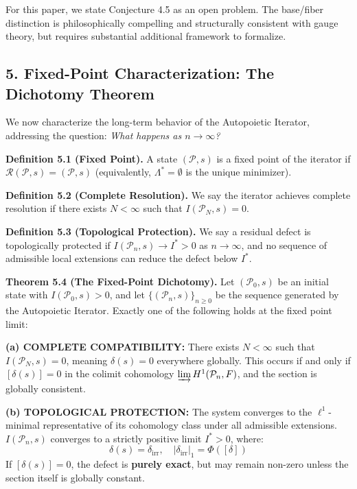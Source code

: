 \documentclass[
]{article}
\begin{document}
For this paper, we state Conjecture 4.5 as an open problem. The
base/fiber distinction is philosophically compelling and structurally
consistent with gauge theory, but requires substantial additional
framework to formalize.

\subsection{5. Fixed-Point Characterization: The Dichotomy
Theorem}\label{fixed-point-characterization-the-dichotomy-theorem}

We now characterize the long-term behavior of the Autopoietic Iterator,
addressing the question: \emph{What happens as \(n \to \infty\)?}

\textbf{Definition 5.1 (Fixed Point).} A state \((\mathcal{P}, s)\) is a
fixed point of the iterator if
\(\mathcal{R}(\mathcal{P}, s) = (\mathcal{P}, s)\) (equivalently,
\(\Lambda^* = \emptyset\) is the unique minimizer).

\textbf{Definition 5.2 (Complete Resolution).} We say the iterator
achieves complete resolution if there exists \(N < \infty\) such that
\(I(\mathcal{P}_N, s) = 0\).

\textbf{Definition 5.3 (Topological Protection).} We say a residual
defect is topologically protected if \(I(\mathcal{P}_n, s) \to I^* > 0\)
as \(n \to \infty\), and no sequence of admissible local extensions can
reduce the defect below \(I^*\).

\textbf{Theorem 5.4 (The Fixed-Point Dichotomy).} Let
\((\mathcal{P}_0, s)\) be an initial state with
\(I(\mathcal{P}_0, s) > 0\), and let
\(\{(\mathcal{P}_n, s)\}_{n \geq 0}\) be the sequence generated by the
Autopoietic Iterator. Exactly one of the following holds at the fixed
point limit:

\textbf{(a) COMPLETE COMPATIBILITY:} There exists \(N < \infty\) such
that \(I(\mathcal{P}_N, s) = 0\), meaning \(\delta(s) = 0\) everywhere
globally. This occurs if and only if \([\delta(s)] = 0\) in the colimit
cohomology \(\varinjlim H^1(\mathcal{P}_n, F)\), and the section is
globally consistent.

\textbf{(b) TOPOLOGICAL PROTECTION:} The system converges to the
\(\ell^1\)-minimal representative of its cohomology class under all
admissible extensions. \(I(\mathcal{P}_n, s)\) converges to a strictly
positive limit \(I^* > 0\), where:
\[ \delta(s) = \delta_{\text{irr}}, \quad |\delta_{\text{irr}}|_1 = \Phi([\delta]) \]
If \([\delta(s)] = 0\), the defect is \textbf{purely exact}, but may
remain non-zero unless the section itself is globally constant.
\end{document}
